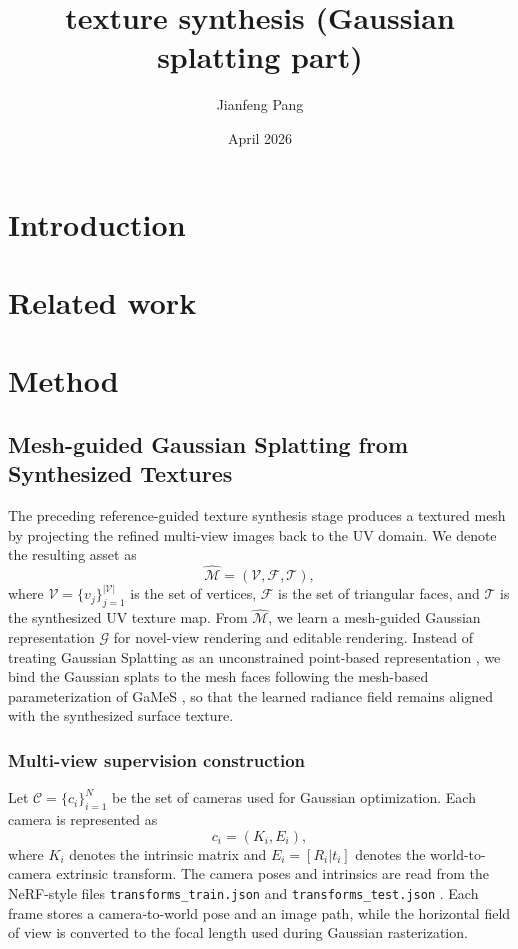 \documentclass{article}
\title{texture synthesis (Gaussian splatting part)}
\author{Jianfeng Pang }
\date{April 2026}
\begin{document}
\maketitle

\section{Introduction}

\section{Related work}


\section{Method}



\subsection{Mesh-guided Gaussian Splatting from Synthesized Textures}
The preceding reference-guided texture synthesis stage produces a textured mesh by projecting the refined multi-view images back to the UV domain. We denote the resulting asset as
\begin{equation}
\hat{\mathcal{M}} = (\mathcal{V}, \mathcal{F}, \mathcal{T}),
\end{equation}
where $\mathcal{V}=\{v_j\}_{j=1}^{|\mathcal{V}|}$ is the set of vertices, $\mathcal{F}$ is the set of triangular faces, and $\mathcal{T}$ is the synthesized UV texture map. From $\hat{\mathcal{M}}$, we learn a mesh-guided Gaussian representation $\mathcal{G}$ for novel-view rendering and editable rendering. Instead of treating Gaussian Splatting as an unconstrained point-based representation \cite{kerbl3Dgaussians}, we bind the Gaussian splats to the mesh faces following the mesh-based parameterization of GaMeS \cite{waczynska2024games}, so that the learned radiance field remains aligned with the synthesized surface texture.

\subsubsection{Multi-view supervision construction}
Let $\mathcal{C}=\{c_i\}_{i=1}^{N}$ be the set of cameras used for Gaussian optimization. Each camera is represented as
\begin{equation}
c_i=(K_i,E_i),
\end{equation}
where $K_i$ denotes the intrinsic matrix and $E_i=[R_i|t_i]$ denotes the world-to-camera extrinsic transform. The camera poses and intrinsics are read from the NeRF-style files \texttt{transforms\_train.json} and \texttt{transforms\_test.json} \cite{mildenhall2020nerf}. Each frame stores a camera-to-world pose and an image path, while the horizontal field of view is converted to the focal length used during Gaussian rasterization.
\end{document}
